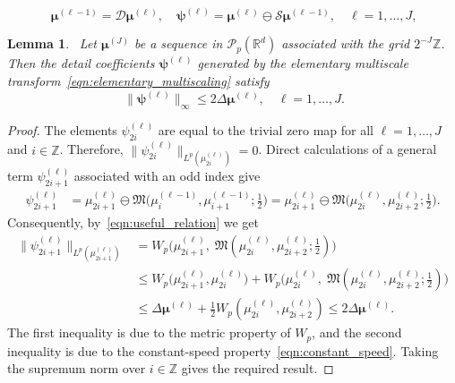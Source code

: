 \documentclass[10pt,a4paper]{amsart}
\newtheorem{lemma}{Lemma}
\begin{document}
\begin{equation}~\label{eqn:elementary_multiscaling}
    \boldsymbol{\mu}^{(\ell-1)}=\mathcal{D}\boldsymbol{\mu}^{(\ell)}, \quad \boldsymbol{\psi}^{(\ell)}= \boldsymbol{\mu}^{(\ell)} \ominus \mathcal{S}\boldsymbol{\mu}^{(\ell-1)}, \quad \ell=1,\dots, J,
\end{equation}

\begin{lemma}~\label{lem:details_delta_bound}
     Let $\boldsymbol{\mu}^{(J)}$ be a sequence in $\mathcal{P}_p(\mathbb{R}^d)$ associated with the grid $2^{-J}\mathbb{Z}$. Then the detail coefficients $\boldsymbol{\psi}^{(\ell)}$ generated by the elementary multiscale transform~\eqref{eqn:elementary_multiscaling} satisfy
     \begin{equation}~\label{eqn:details_delta_bound}
         \|\boldsymbol{\psi}^{(\ell)}\|_{\infty} \leq 2\Delta \boldsymbol{\mu}^{(\ell)}, \quad \ell=1,\dots,J.
     \end{equation}
\end{lemma}

\begin{proof}
    The elements $\psi^{(\ell)}_{2i}$ are equal to the trivial zero map for all $\ell=1,\dots,J$ and $i\in\mathbb{Z}$. Therefore, $\|\psi^{(\ell)}_{2i}\|_{L^p(\mu^{(\ell)}_{2i})}=0$. Direct calculations of a general term $\psi^{(\ell)}_{2i+1}$ associated with an odd index give
    \begin{align*}
        \psi^{(\ell)}_{2i+1} & = \mu^{(\ell)}_{2i+1} \ominus \mathfrak{M}\big(\mu^{(\ell-1)}_{i}, \mu^{(\ell-1)}_{i+1}; \frac{1}{2}\big) = \mu^{(\ell)}_{2i+1} \ominus \mathfrak{M}\big(\mu^{(\ell)}_{2i}, \mu^{(\ell)}_{2i+2}; \frac{1}{2}\big).
    \end{align*}
    Consequently, by~\eqref{eqn:useful_relation} we get
    \begin{align*}
        \|\psi^{(\ell)}_{2i+1}\|_{L^p(\mu^{(\ell)}_{2i+1})} & = W_p\big(\mu^{(\ell)}_{2i+1},\; \mathfrak{M}(\mu^{(\ell)}_{2i}, \mu^{(\ell)}_{2i+2}; \frac{1}{2})\big) \\
        & \leq W_p\big(\mu^{(\ell)}_{2i+1}, \mu^{(\ell)}_{2i}\big) + W_p\big(\mu^{(\ell)}_{2i},\;\mathfrak{M}(\mu^{(\ell)}_{2i}, \mu^{(\ell)}_{2i+2}; \frac{1}{2})\big) \\
        & \leq \Delta \boldsymbol{\mu}^{(\ell)} + \frac{1}{2} W_p(\mu^{(\ell)}_{2i}, \mu^{(\ell)}_{2i+2}) \leq 2 \Delta \boldsymbol{\mu}^{(\ell)}.
    \end{align*}
    The first inequality is due to the metric property of $W_p$, and the second inequality is due to the constant-speed property~\eqref{eqn:constant_speed}. Taking the supremum norm over $i\in\mathbb{Z}$ gives the required result.
\end{proof}
\end{document}
